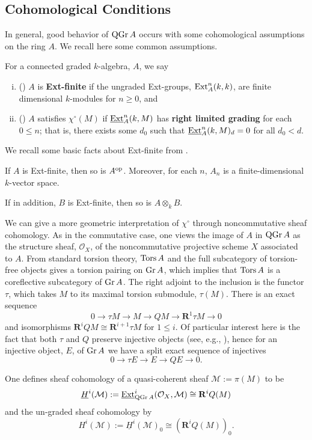 \documentclass[reqno, 12pt]{amsart}
\begin{document}
\subsection{Cohomological Conditions}
In general, good behavior of $\operatorname{QGr}A$ occurs with some cohomological assumptions on the ring $A$.
We recall here some common assumptions.
\begin{definition}
  For a connected graded $k$-algebra, $A$, we say
  \begin{enumerate}[(i)]
  \item
    (\cite{VdB}) $A$ is \textbf{Ext-finite} if the ungraded Ext-groups, $\operatorname{Ext}^n_A(k,k)$, are finite dimensional $k$-modules for $n \geq 0$, and
  \item
    (\cite{AZ}) $A$ satisfies $\chi^\circ(M)$ if $\underline{\operatorname{Ext}}_A^n(k,M)$ has \textbf{right limited grading} for each $0 \leq n$; that is, there exists some $d_0$ such that $\underline{\operatorname{Ext}}_A^n(k,M)_d = 0$ for all $d_0 < d$.
  \end{enumerate}
\end{definition}

We recall some basic facts about Ext-finite from \cite{VdB}.
\begin{lemma}
  If $A$ is Ext-finite, then so is $A^{\operatorname{op}}$.
  Moreover, for each $n$, $A_n$ is a finite-dimensional $k$-vector space.

  If in addition, $B$ is Ext-finite, then so is $A \otimes_k B$.
\end{lemma}

We can give a more geometric interpretation of $\chi^\circ$ through noncommutative sheaf cohomology.
As in the commutative case, one views the image of $A$ in $\operatorname{QGr}A$ as the structure sheaf, $\mathcal{O}_X$, of the noncommutative projective scheme $X$ associated to $A$.
From standard torsion theory, $\operatorname{Tors}A$ and the full subcategory of torsion-free objects gives a torsion pairing on $\operatorname{Gr}A$, which implies that $\operatorname{Tors}A$ is a coreflective subcategory of $\operatorname{Gr}A$.
The right adjoint to the inclusion is the functor $\tau$, which takes $M$ to its maximal torsion submodule, $\tau(M)$.
There is an exact sequence
$$0 \to \tau M \to M \to Q M \to \mathbf{R}^1\tau M \to 0$$
and isomorphisms $\mathbf{R}^iQ M \cong \mathbf{R}^{i+1}\tau M$ for $1 \leq i$.
Of particular interest here is the fact that both $\tau$ and $Q$ preserve injective objects (see, e.g., \cite{AZ}), hence for an injective object, $E$, of $\operatorname{Gr}A$ we have a split exact sequence of injectives
$$0 \to \tau E \to E \to Q E \to 0.$$
\begin{definition}
  One defines sheaf cohomology of a quasi-coherent sheaf $\mathcal{M} := \pi(M)$ to be
  $$\underline{H}^i(\mathcal{M}) := \underline{\operatorname{Ext}}^i_{\operatorname{QGr}A}(\mathcal{O}_X, \mathcal{M}) \cong \mathbf{R}^iQ (M)$$
  and the un-graded sheaf cohomology by
  $$H^i(\mathcal{M}) := \underline{H}^i(\mathcal{M})_0 \cong (\mathbf{R}^iQ(M))_0.$$
\end{definition}
\end{document}
